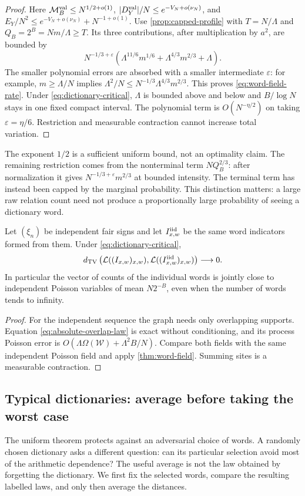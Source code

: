 \begin{proof}
Here $\mathcal M_B^{\rm val}\le N^{1/2+o(1)}$,
$|D_Y^{\rm val}|/N\le e^{-V_N+o(\nu_N)}$, and
$E_Y/N^2\le e^{-V_N+o(\nu_N)}+N^{-1+o(1)}$.
Use \cref{prop:capped-profile} with $T=N/\Lambda$ and
$Q_B=2^B=Nm/\Lambda\ge T$. Its three contributions, after multiplication
by $a^2$, are bounded by
\[
 N^{-1/3+\varepsilon}
 \left(\Lambda^{11/6}m^{1/6}
                +\Lambda^{4/3}m^{2/3}+\Lambda\right).
\]
The smaller polynomial errors are absorbed with a smaller intermediate
$\varepsilon$: for example, $m\ge\Lambda/N$ implies
$\Lambda^2/N\le
N^{-1/3}\Lambda^{4/3}m^{2/3}$. This proves
\eqref{eq:word-field-rate}.
Under \eqref{eq:dictionary-critical}, $\Lambda$ is bounded above and
below and $B/\log N$ stays in one fixed compact interval. The polynomial
term is $O(N^{-\eta/2})$ on taking $\varepsilon=\eta/6$.
Restriction and measurable contraction cannot increase total variation.
\end{proof}

The exponent $1/2$ is a sufficient uniform bound, not an optimality claim. The
remaining restriction comes from the nonterminal term $NQ_B^{2/3}$:
after normalization it gives $N^{-1/3+\varepsilon}m^{2/3}$ at bounded
intensity. The terminal term has instead been capped by the marginal
probability. This distinction matters: a large raw relation count need
not produce a proportionally large probability of seeing a dictionary
word.

\begin{corollary}\label{cor:iid-word-replacement}
Let $(\xi_n)$ be independent fair signs and let $I^{\rm iid}_{x,w}$ be the
same word indicators formed from them. Under
\eqref{eq:dictionary-critical},
\[
 d_{\mathrm{TV}}\left(\mathcal L((I_{x,w})_{x,w}),
                     \mathcal L((I^{\rm iid}_{x,w})_{x,w})\right)\longrightarrow0.
\]
In particular the vector of counts of the individual words is jointly
close to independent Poisson variables of mean $N2^{-B}$, even when the
number of words tends to infinity.
\end{corollary}
\begin{proof}
For the independent sequence the graph needs only overlapping supports.
Equation \eqref{eq:absolute-overlap-law} is exact without conditioning,
and its process Poisson error is
$O(\Lambda\Omega(\mathcal W)+\Lambda^2B/N)$.
Compare both fields with the same independent Poisson field and apply
\cref{thm:word-field}. Summing sites is a measurable contraction.
\end{proof}

\subsection{Typical dictionaries: average before taking the worst case}
\label{sec:typical-dictionaries}
The uniform theorem protects against an adversarial choice of words. A
randomly chosen dictionary asks a different question: can its particular
selection avoid most of the arithmetic dependence? The useful average is
not the law obtained by forgetting the dictionary. We first fix the
selected words, compare the resulting labelled laws, and only then average
the distances.

